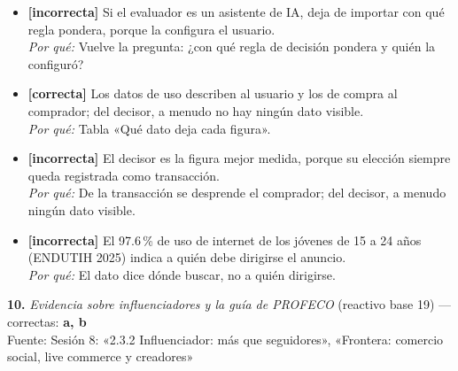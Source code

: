 \documentclass[10pt,letterpaper]{article}
\begin{document}
\begin{itemize}[leftmargin=1.2em,itemsep=0pt,topsep=1pt,parsep=0pt]
\item[\textbf{a)}] {\footnotesize \textbf{[incorrecta]} Si el evaluador es un asistente de IA, deja de importar con qué regla pondera, porque la configura el usuario.\\ \textit{Por qué:} Vuelve la pregunta: ¿con qué regla de decisión pondera y quién la configuró?}
\item[\textbf{b)}] {\footnotesize \textbf{[correcta]} Los datos de uso describen al usuario y los de compra al comprador; del decisor, a menudo no hay ningún dato visible.\\ \textit{Por qué:} Tabla «Qué dato deja cada figura».}
\item[\textbf{c)}] {\footnotesize \textbf{[incorrecta]} El decisor es la figura mejor medida, porque su elección siempre queda registrada como transacción.\\ \textit{Por qué:} De la transacción se desprende el comprador; del decisor, a menudo ningún dato visible.}
\item[\textbf{d)}] {\footnotesize \textbf{[incorrecta]} El 97.6\,\% de uso de internet de los jóvenes de 15 a 24 años (ENDUTIH 2025) indica a quién debe dirigirse el anuncio.\\ \textit{Por qué:} El dato dice dónde buscar, no a quién dirigirse.}
\end{itemize}
\vspace{3pt}\noindent\textbf{10.} \textit{Evidencia sobre influenciadores y la guía de PROFECO} (reactivo base 19) — correctas: \textbf{a, b}\\[-1pt]
{\scriptsize Fuente: Sesión 8: «2.3.2 Influenciador: más que seguidores», «Frontera: comercio social, live commerce y creadores»}
\end{document}
